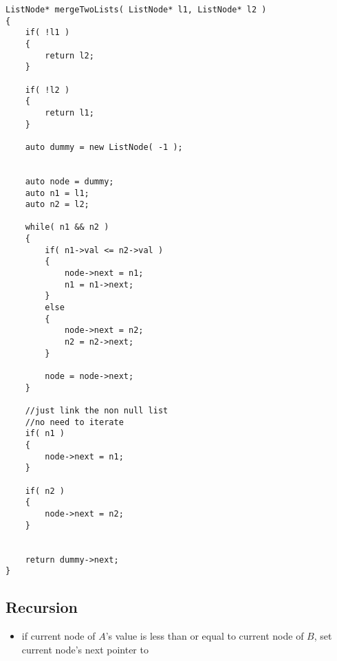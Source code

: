 \setcounter{lstlisting}{0}
\begin{lstlisting}[style=customc, caption={Merge Sort}]
ListNode* mergeTwoLists( ListNode* l1, ListNode* l2 )
{
    if( !l1 )
    {
        return l2;
    }

    if( !l2 )
    {
        return l1;
    }

    auto dummy = new ListNode( -1 );


    auto node = dummy;
    auto n1 = l1;
    auto n2 = l2;

    while( n1 && n2 )
    {
        if( n1->val <= n2->val )
        {
            node->next = n1;
            n1 = n1->next;
        }
        else
        {
            node->next = n2;
            n2 = n2->next;
        }

        node = node->next;
    }

    //just link the non null list
    //no need to iterate
    if( n1 )
    {
        node->next = n1;
    }

    if( n2 )
    {
        node->next = n2;
    }


    return dummy->next;
}
\end{lstlisting}

\subsection{Recursion}
\begin{itemize}
\item if current node of $A$'s value is less than or equal to current node of $B$, set current node's next pointer to 
\end{itemize}
